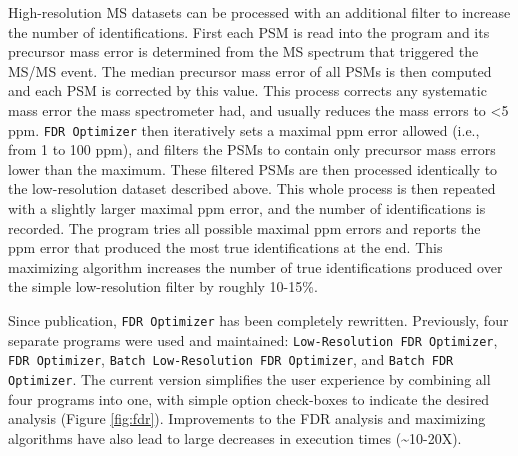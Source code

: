 High-resolution MS datasets can be processed with an additional filter to increase the number of identifications. First each PSM is read into the program and its precursor mass error is determined from the MS spectrum that triggered the MS/MS event. The median precursor mass error of all PSMs is then computed and each PSM is corrected by this value. This process corrects any systematic mass error the mass spectrometer had, and usually reduces the mass errors to <5 ppm. \texttt{FDR Optimizer} then iteratively sets a maximal ppm error allowed (i.e., from 1 to 100 ppm), and filters the PSMs to contain only precursor mass errors lower than the maximum. These filtered PSMs are then processed identically to the low-resolution dataset described above. This whole process is then repeated with a slightly larger maximal ppm error, and the number of identifications is recorded. The program tries all possible maximal ppm errors and reports the ppm error that produced the most true identifications at the end. This maximizing algorithm increases the number of true identifications produced over the simple low-resolution filter by roughly 10-15\%.

Since publication, \texttt{FDR Optimizer} has been completely rewritten. Previously, four separate programs were used and maintained: \texttt{Low-Resolution FDR Optimizer}, \texttt{FDR Optimizer}, \texttt{Batch Low-Resolution FDR Optimizer}, and \texttt{Batch FDR Optimizer}. The current version simplifies the user experience by combining all four programs into one, with simple option check-boxes to indicate the desired analysis (Figure \ref{fig:fdr}). Improvements to the FDR analysis and maximizing algorithms have also lead to large decreases in execution times (\textasciitilde10-20X).

